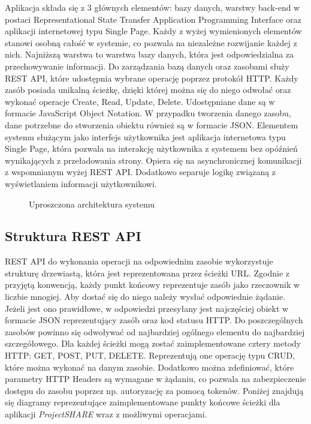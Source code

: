Aplikacja składa się z 3 głównych elementów: bazy danych, warstwy back-end w postaci Representational State Transfer Application Programming Interface oraz aplikacji internetowej typu Single Page. Każdy z wyżej wymienionych elementów stanowi osobną całość w systemie, co pozwala na niezależne rozwijanie każdej z nich. Najniższą warstwa to warstwa bazy danych, która jest odpowiedzialna za przechowywanie informacji. Do zarządzania bazą danych oraz zasobami służy REST API, które udostępnia wybrane operację poprzez protokół HTTP. Każdy zasób posiada unikalną ścieżkę, dzięki której można się do niego odwołać oraz wykonać operacje Create, Read, Update, Delete. Udostępniane dane są w formacie JavaScript Object Notation. W przypadku tworzenia danego zasobu, dane potrzebne do stworzenia obiektu również są w formacie JSON. Elementem systemu służącym jako interfejs użytkownika jest aplikacja internetowa typu Single Page, która pozwala na interakcję użytkownika z systemem bez opóźnień wynikających z przeładowania strony. Opiera się na asynchronicznej komunikacji z wspomnianym wyżej REST API. Dodatkowo separuje logikę związaną z wyświetlaniem informacji użytkownikowi.
\bigskip

\begin{figure}[h!]
	\caption{Uproszczona architektura systemu}
	\centering
\end{figure}

\bigskip

\subsection{Struktura REST API}

REST API do wykonania operacji na odpowiednim zasobie wykorzystuje strukturę drzewiastą, która jest reprezentowana przez ścieżki URL. Zgodnie z przyjętą konwencją, każdy punkt końcowy reprezentuje zasób jako rzeczownik w liczbie mnogiej. Aby dostać się do niego należy wysłać odpowiednie żądanie. Jeżeli jest ono prawidłowe, w odpowiedzi przesyłany jest najczęściej obiekt w formacie JSON reprezentujący zasób oraz kod statusu HTTP. Do poszczególnych zasobów powinno się odwoływać od najbardziej ogólnego elementu do najbardziej szczegółowego. Dla każdej ścieżki mogą zostać zaimplementowane cztery metody HTTP: GET, POST, PUT, DELETE. Reprezentują one operację typu CRUD, które można wykonać na danym zasobie. Dodatkowo można zdefiniować, które parametry HTTP Headers są wymagane w żądaniu, co pozwala na zabezpieczenie dostępu do zasobu poprzez np. autoryzację za pomocą tokenów. Poniżej znajdują się diagramy reprezentujące zaimplementowane punkty końcowe ścieżki dla aplikacji \mbox{\textit{ProjectSHARE}} wraz z możliwymi operacjami.

